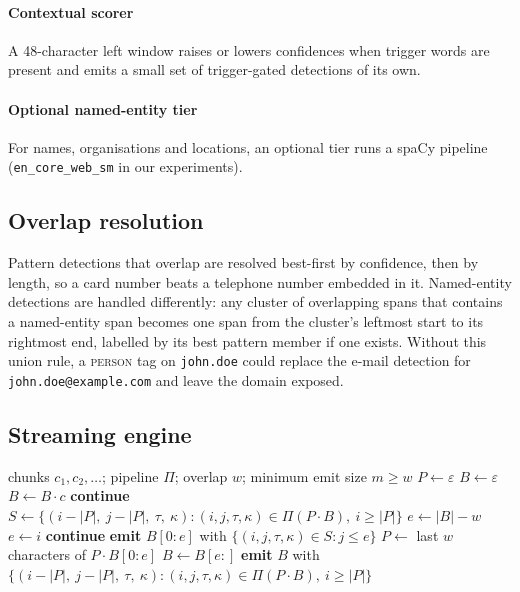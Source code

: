 \documentclass[pdflatex,sn-mathphys-num]{sn-jnl}
\theoremstyle{thmstyleone}
\theoremstyle{thmstylethree}
\begin{document}
\paragraph{Contextual scorer}
A 48-character left window raises or lowers confidences when trigger words are present and emits a small set of trigger-gated detections of its own.

\paragraph{Optional named-entity tier}
For names, organisations and locations, an optional tier runs a spaCy pipeline (\texttt{en\_core\_web\_sm} in our experiments).

\subsection{Overlap resolution}
Pattern detections that overlap are resolved best-first by confidence, then by length, so a card number beats a telephone number embedded in it. Named-entity detections are handled differently: any cluster of overlapping spans that contains a named-entity span becomes one span from the cluster's leftmost start to its rightmost end, labelled by its best pattern member if one exists. Without this union rule, a \textsc{person} tag on \texttt{john.doe} could replace the e-mail detection for \texttt{john.doe@example.com} and leave the domain exposed.

\subsection{Streaming engine}\label{sec:engine}

\begin{algorithm}[t]
\caption{Streaming detection with overlap $w$}\label{alg:stream}
\begin{algorithmic}[1]
\Require chunks $c_1, c_2, \dots$; pipeline $\Pi$; overlap $w$; minimum emit size $m \ge w$
\State $P \gets \varepsilon$ 
\State $B \gets \varepsilon$ 
  \State $B \gets B \cdot c$
    \State \textbf{continue}
  \EndIf
  \State $S \gets \{(i - |P|,\ j - |P|,\ \tau,\ \kappa) : (i, j, \tau, \kappa) \in \Pi(P \cdot B),\ i \ge |P|\}$
  \State $e \gets |B| - w$ 
    \State $e \gets i$ 
  \EndWhile
    \State \textbf{continue} 
  \EndIf
  \State \textbf{emit} $B[0{:}e]$ with $\{(i, j, \tau, \kappa) \in S : j \le e\}$
  \State $P \gets$ last $w$ characters of $P \cdot B[0{:}e]$
  \State $B \gets B[e{:}]$
\EndFor
\State \textbf{emit} $B$ with $\{(i - |P|,\ j - |P|,\ \tau,\ \kappa) : (i, j, \tau, \kappa) \in \Pi(P \cdot B),\ i \ge |P|\}$
\end{algorithmic}
\end{algorithm}
\end{document}
